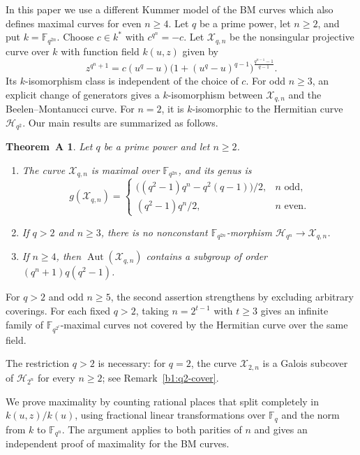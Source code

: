 \documentclass[12pt,reqno]{amsart}
\numberwithin{equation}{section}
\newcommand{\F}{\mathbb F}
\DeclareMathOperator{\Aut}{Aut}
\theoremstyle{plain}
\newtheorem*{theoremA}{Theorem~A}
\theoremstyle{definition}
\theoremstyle{remark}
\begin{document}
In this paper we use a different Kummer model of the BM curves
which also defines maximal curves for even \(n\ge4\).
Let \(q\) be a prime power, let \(n\ge2\), and put
\(k=\F_{q^{2n}}\). Choose \(c\in k^*\) with \(c^{q^n}=-c\).
Let \(\mathcal X_{q,n}\) be the nonsingular projective curve over
\(k\) with function field \(k(u,z)\) given by
\begin{equation}
\label{b1:intro-model}
 z^{q^n+1}=c(u^q-u)
 \bigl(1+(u^q-u)^{q-1}\bigr)^{\frac{q^{n-1}-1}{q-1}}.
\end{equation}
Its \(k\)-isomorphism class is independent of the choice of \(c\).
For odd \(n\ge3\), an explicit change of generators gives a
\(k\)-isomorphism between \(\mathcal X_{q,n}\) and the
Beelen--Montanucci curve.
For \(n=2\), it is \(k\)-isomorphic to the Hermitian curve
\(\mathcal H_{q^2}\).
Our main results are summarized as follows.

\begin{theoremA}
Let \(q\) be a prime power and let \(n\ge2\).
\begin{enumerate}
\item The curve \(\mathcal X_{q,n}\) is maximal over \(\F_{q^{2n}}\), and
its genus is
\[
 g(\mathcal X_{q,n})=
 \begin{cases}
 \bigl((q^2-1)q^n-q^2(q-1)\bigr)/2,&n\text{ odd},\\
 (q^2-1)q^n/2,&n\text{ even}.
 \end{cases}
\]
\item If \(q>2\) and \(n\ge3\), there is no nonconstant
\(\F_{q^{2n}}\)-morphism \(\mathcal H_{q^n}\to\mathcal X_{q,n}\).
\item If \(n\ge4\), then \(\Aut(\mathcal X_{q,n})\) contains a subgroup
of order \((q^n+1)q(q^2-1)\).
\end{enumerate}
\end{theoremA}

For \(q>2\) and odd \(n\ge5\), the second assertion strengthens
\cite[Corollary~2.2]{BM2018} by excluding arbitrary coverings.
For each fixed \(q>2\), taking \(n=2^{t-1}\) with \(t\ge3\)
gives an infinite family of \(\F_{q^{2^t}}\)-maximal curves
not covered by the Hermitian curve over the same field.

The restriction \(q>2\) is necessary: for \(q=2\), the curve
\(\mathcal X_{2,n}\) is a Galois subcover of \(\mathcal H_{2^n}\)
for every \(n\ge2\); see Remark~\ref{b1:q2-cover}.

We prove maximality by counting rational places that split completely
in \(k(u,z)/k(u)\), using fractional linear transformations over
\(\F_q\) and the norm from \(k\) to \(\F_{q^n}\).
The argument applies to both parities of \(n\) and gives an
independent proof of maximality for the BM curves.
\end{document}
